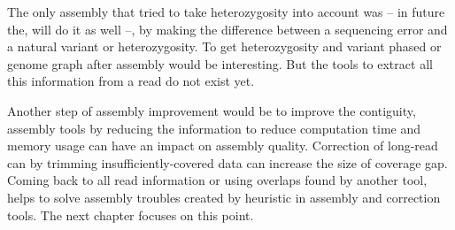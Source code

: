 \documentclass[main]{subfiles}
\begin{document}
The only assembly that tried to take heterozygosity into account was  – in future the, \shasta will do it as well –, by making the difference between a sequencing error and a natural variant or heterozygosity. To get heterozygosity and variant phased or genome graph after assembly would be interesting. But the tools to extract all this information from a read do not exist yet.

Another step of assembly improvement would be to improve the contiguity, assembly tools by reducing the information to reduce computation time and memory usage can have an impact on assembly quality. Correction of long-read can by trimming insufficiently-covered data can increase the size of coverage gap.
Coming back to all read information or using overlaps found by another tool, helps to solve assembly troubles created by heuristic in assembly and correction tools. The next chapter focuses on this point.


\end{document}
